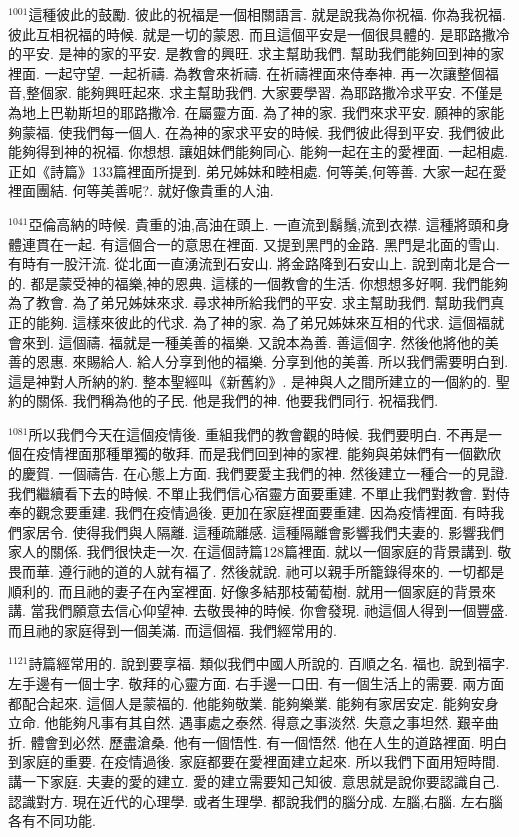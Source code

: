 \documentclass{book}
\begin{document}
$^{1001}$這種彼此的鼓勵.
彼此的祝福是一個相關語言.
就是說我為你祝福.
你為我祝福.
彼此互相祝福的時候.
就是一切的蒙恩.
而且這個平安是一個很具體的.
是耶路撒冷的平安.
是神的家的平安.
是教會的興旺.
求主幫助我們.
幫助我們能夠回到神的家裡面.
一起守望.
一起祈禱.
為教會來祈禱.
在祈禱裡面來侍奉神.
再一次讓整個福音,整個家.
能夠興旺起來.
求主幫助我們.
大家要學習.
為耶路撒冷求平安.
不僅是為地上巴勒斯坦的耶路撒冷.
在屬靈方面.
為了神的家.
我們來求平安.
願神的家能夠蒙福.
使我們每一個人.
在為神的家求平安的時候.
我們彼此得到平安.
我們彼此能夠得到神的祝福.
你想想.
讓姐妹們能夠同心.
能夠一起在主的愛裡面.
一起相處.
正如《詩篇》133篇裡面所提到.
弟兄姊妹和睦相處.
何等美,何等善.
大家一起在愛裡面團結.
何等美善呢?.
就好像貴重的人油.

$^{1041}$亞倫高納的時候.
貴重的油,高油在頭上.
一直流到鬍鬚,流到衣襟.
這種將頭和身體連貫在一起.
有這個合一的意思在裡面.
又提到黑門的金路.
黑門是北面的雪山.
有時有一股汗流.
從北面一直湧流到石安山.
將金路降到石安山上.
說到南北是合一的.
都是蒙受神的福樂,神的恩典.
這樣的一個教會的生活.
你想想多好啊.
我們能夠為了教會.
為了弟兄姊妹來求.
尋求神所給我們的平安.
求主幫助我們.
幫助我們真正的能夠.
這樣來彼此的代求.
為了神的家.
為了弟兄姊妹來互相的代求.
這個福就會來到.
這個禱.
福就是一種美善的福樂.
又說本為善.
善這個字.
然後他將他的美善的恩惠.
來賜給人.
給人分享到他的福樂.
分享到他的美善.
所以我們需要明白到.
這是神對人所納的約.
整本聖經叫《新舊約》.
是神與人之間所建立的一個約的.
聖約的關係.
我們稱為他的子民.
他是我們的神.
他要我們同行.
祝福我們.

$^{1081}$所以我們今天在這個疫情後.
重組我們的教會觀的時候.
我們要明白.
不再是一個在疫情裡面那種單獨的敬拜.
而是我們回到神的家裡.
能夠與弟妹們有一個歡欣的慶賀.
一個禱告.
在心態上方面.
我們要愛主我們的神.
然後建立一種合一的見證.
我們繼續看下去的時候.
不單止我們信心宿靈方面要重建.
不單止我們對教會.
對侍奉的觀念要重建.
我們在疫情過後.
更加在家庭裡面要重建.
因為疫情裡面.
有時我們家居令.
使得我們與人隔離.
這種疏離感.
這種隔離會影響我們夫妻的.
影響我們家人的關係.
我們很快走一次.
在這個詩篇128篇裡面.
就以一個家庭的背景講到.
敬畏而華.
遵行祂的道的人就有福了.
然後就說.
祂可以親手所籠錄得來的.
一切都是順利的.
而且祂的妻子在內室裡面.
好像多結那枝葡萄樹.
就用一個家庭的背景來講.
當我們願意去信心仰望神.
去敬畏神的時候.
你會發現.
祂這個人得到一個豐盛.
而且祂的家庭得到一個美滿.
而這個福.
我們經常用的.

$^{1121}$詩篇經常用的.
說到要享福.
類似我們中國人所說的.
百順之名.
福也.
說到福字.
左手邊有一個士字.
敬拜的心靈方面.
右手邊一口田.
有一個生活上的需要.
兩方面都配合起來.
這個人是蒙福的.
他能夠敬業.
能夠樂業.
能夠有家居安定.
能夠安身立命.
他能夠凡事有其自然.
遇事處之泰然.
得意之事淡然.
失意之事坦然.
艱辛曲折.
體會到必然.
歷盡滄桑.
他有一個悟性.
有一個悟然.
他在人生的道路裡面.
明白到家庭的重要.
在疫情過後.
家庭都要在愛裡面建立起來.
所以我們下面用短時間.
講一下家庭.
夫妻的愛的建立.
愛的建立需要知己知彼.
意思就是說你要認識自己.
認識對方.
現在近代的心理學.
或者生理學.
都說我們的腦分成.
左腦,右腦.
左右腦各有不同功能.
\end{document}
